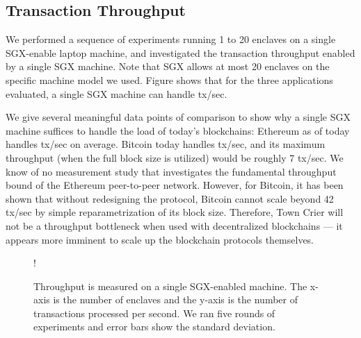\subsection{Transaction Throughput}
We performed a sequence of experiments running 1 to 20 enclaves 
on a single SGX-enable laptop
machine, and investigated the transaction throughput 
enabled by a single SGX machine. 
Note that SGX allows at most 20 enclaves on the specific machine model we used.
Figure  
shows that for the three applications evaluated,
a single SGX machine can handle
tx/sec.

We give several meaningful data points of comparison to show
why a single SGX machine suffices to handle the load of
today's blockchains: 
Ethereum as of today handles 
 tx/sec on average. 
Bitcoin today handles
 tx/sec, and 
its maximum throughput (when the full block size is utilized)
would be roughly 7 tx/sec.
We know of no measurement study that 
investigates the fundamental 
throughput bound of the Ethereum  peer-to-peer network.
However, for Bitcoin, it has been shown that without
redesigning the protocol, 
Bitcoin cannot scale beyond  
42 tx/sec by simple reparametrization of its block size.
Therefore, Town Crier will not be a throughput 
bottleneck when used 
with decentralized blockchains --- it appears 
more imminent to scale up 
the blockchain protocols themselves.


\begin{figure}[h]
  \resizebox {\columnwidth} {!}{
}
\caption{Throughput is measured on a single SGX-enabled machine. The x-axis is
the number of enclaves and the y-axis is the number of transactions processed per
second.  We ran five rounds of experiments and error bars show the standard
deviation.}
\end{figure}

